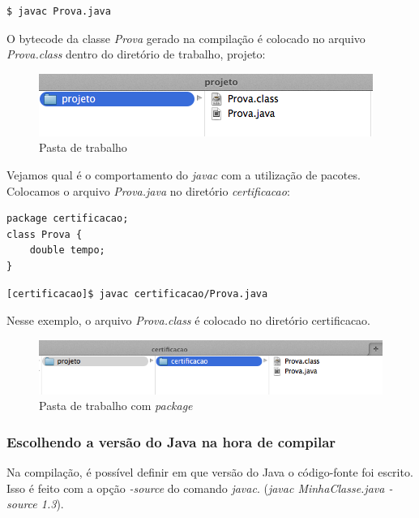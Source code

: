\documentclass[12pt]{article}
\begin{document}
\begin{lstlisting}
$ javac Prova.java
\end{lstlisting}

O bytecode da classe \textit{Prova} gerado na compilação é colocado no arquivo \textit{Prova.class} dentro do diretório de trabalho, projeto:

\begin{figure}[H]
	\centering
	\includegraphics[width=0.7\linewidth]{figuras/estrutura1}
	\caption[Pasta de trabalho]{Pasta de trabalho}
	\label{fig:estrutura1}
\end{figure}


Vejamos qual é o comportamento do \textit{javac} com a utilização de pacotes. Colocamos o arquivo \textit{Prova.java} no diretório \textit{certificacao}:

\begin{lstlisting}
package certificacao;
class Prova {
	double tempo;
}
\end{lstlisting}

\begin{lstlisting}
[certificacao]$ javac certificacao/Prova.java
\end{lstlisting}

Nesse exemplo, o arquivo \textit{Prova.class} é colocado no diretório certificacao.

\begin{figure}[H]
	\centering
	\includegraphics[width=0.7\linewidth]{figuras/estrutura2}
	\caption[Pasta de trabalho com \textit{package}]{Pasta de trabalho com \textit{package}}
	\label{fig:estrutura2}
\end{figure}

\subsubsection{Escolhendo a versão do Java na hora de compilar}

Na compilação, é possível definir em que versão do Java o código-fonte foi escrito. Isso é feito com a opção \textit{-source} do comando \textit{javac}. (\textit{javac MinhaClasse.java -source 1.3}).
\end{document}
